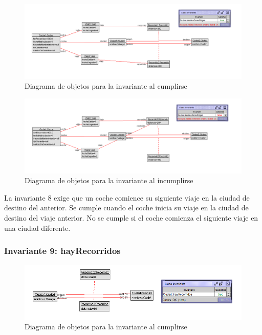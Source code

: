 \documentclass[12pt.a4paper]{article}
\begin{document}
\vspace{1.0 cm}
\begin{figure}[H]
     \includegraphics[width=1\linewidth]{Soils/8.png}
     \caption{Diagrama de objetos para la invariante al cumplirse}
     \label{Diagrama del sistema de aviacion}
\end{figure}

\begin{figure}[H]
     \includegraphics[width=1\linewidth]{Soils/8_v2.png}
     \caption{Diagrama de objetos para la invariante al incumplirse}
     \label{Diagrama del sistema de aviacion}
\end{figure}

La invariante 8 exige que un coche comience su siguiente viaje en la ciudad de destino del anterior. Se cumple cuando el coche inicia su viaje en la ciudad de destino del viaje anterior. No se cumple si el coche comienza el siguiente viaje en una ciudad diferente.

\subsubsection{Invariante 9: hayRecorridos}
    \begin{figure}[H]
         \centering
         \includegraphics[width=1\linewidth]{Soils/9.png}
         \caption{Diagrama de objetos para la invariante al cumplirse}
         \label{Diagrama_cumplimiento}
    \end{figure}
\end{document}
